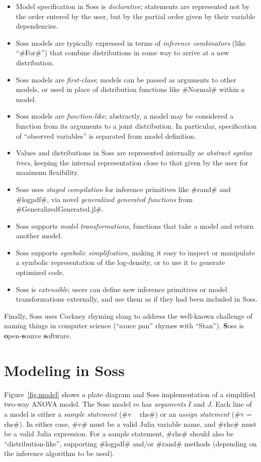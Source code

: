 \documentclass[anonymous=false, %
               format=acmsmall, %
               review=false, %
               screen=true, %
               nonacm=true]{acmart}
\begin{document}
\begin{itemize}
    \item Model specification in Soss is \emph{declarative}; statements are represented not by the order entered by the user, but by the partial order given by their variable dependencies.
    \item Soss models are typically expressed in terms of \emph{inference combinators} (like ``\jl#For#'') that combine distributions in some way to arrive at a new distribution.
    \item Soss models are \emph{first-class}; models can be passed as arguments to other models, or used in place of distribution functions like \jl#Normal# within a model.
    \item Soss models are \emph{function-like}; abstractly, a model may be considered a function from its arguments to a joint distribution. In particular, specification of ``observed variables'' is separated from model definition.
    \item Values and distributions in Soss are represented internally as \emph{abstract syntax trees}, keeping the internal representation close to that given by the user for maximum flexibility.
    \item Soss uses \emph{staged compilation} for inference primitives like \jl#rand# and \jl#logpdf#, via novel \emph{generalized generated functions} from \jl#GeneralizedGenerated.jl#.
    \item Soss supports \emph{model transformations}, functions that take a model and return another model.
    \item Soss supports \emph{symbolic simplifcation}, making it easy to inspect or manipulate a symbolic representation of the log-density, or to use it to generate optimized code.
    \item Soss is \emph{extensible}; users can define new inference primitives or model transformations externally, and use them as if they had been included in Soss.
\end{itemize}

Finally, Soss uses Cockney rhyming slang to address the well-known challenge of naming things in computer science (``sauce pan'' rhymes with ``Stan''). {\bf S}oss is {\bf o}pen-{\bf s}ource {\bf s}oftware.

\section{Modeling in Soss}

Figure~\ref{fig:model} shows a plate diagram and Soss implementation of a simplified two-way ANOVA model. The Soss model $m$ has \emph{arguments} $I$ and $J$. Each line of a model is either a \emph{sample statement} (\jl#v ~ rhs#) or an \emph{assign statement} (\jl#v = rhs#). In either case, \jl#v# must be a valid Julia variable name, and \jl#rhs# must be a valid Julia expression. For a sample statement, \jl#rhs# should also be ``distribution-like'', supporting \jl#logpdf# and/or \jl#rand# methods (depending on the inference algorithm to be used).
\end{document}
